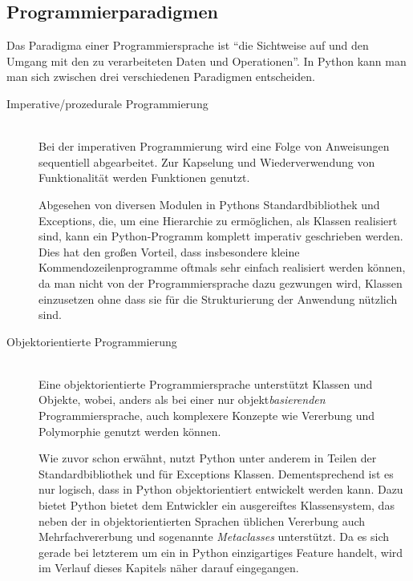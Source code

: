 \subsection{Programmierparadigmen}

Das Paradigma einer Programmiersprache ist \enquote{die Sichtweise auf und den Umgang mit
den zu verarbeiteten Daten und Operationen}. \citep[Kap. 1.3.1]{progsprachen} In Python kann man
man sich zwischen drei verschiedenen Paradigmen entscheiden.

\begin{description}
\item[Imperative/prozedurale Programmierung] \hfill \\
Bei der imperativen Programmierung wird eine Folge von Anweisungen sequentiell abgearbeitet. Zur
Kapselung und Wiederverwendung von Funktionalität werden Funktionen genutzt.
\citep[Kap. 1.3.1]{progsprachen}

Abgesehen von diversen Modulen in Pythons Standardbibliothek und Exceptions, die, um eine Hierarchie
zu ermöglichen, als Klassen realisiert sind, kann ein Python-Programm komplett imperativ geschrieben
werden. Dies hat den großen Vorteil, dass insbesondere kleine Kommendozeilenprogramme oftmals sehr
einfach realisiert werden können, da man nicht von der Programmiersprache dazu gezwungen wird,
Klassen einzusetzen ohne dass sie für die Strukturierung der Anwendung nützlich sind.



\item[Objektorientierte Programmierung] \hfill \\
Eine objektorientierte Programmiersprache unterstützt Klassen und Objekte, wobei, anders als bei
einer nur objekt\emph{basierenden} Programmiersprache, auch komplexere Konzepte wie Vererbung und
Polymorphie genutzt werden können.
\citep[Kap. 1.3.1]{progsprachen}

Wie zuvor schon erwähnt, nutzt Python unter anderem in Teilen der Standardbibliothek und für
Exceptions Klassen. Dementsprechend ist es nur logisch, dass in Python objektorientiert entwickelt
werden kann. Dazu bietet Python bietet dem Entwickler ein ausgereiftes Klassensystem, das neben der
in objektorientierten Sprachen üblichen Vererbung auch Mehrfachvererbung und sogenannte
\emph{Metaclasses} unterstützt. Da es sich gerade bei letzterem um ein in Python einzigartiges
Feature handelt, wird im Verlauf dieses Kapitels näher darauf eingegangen.




\end{description}
